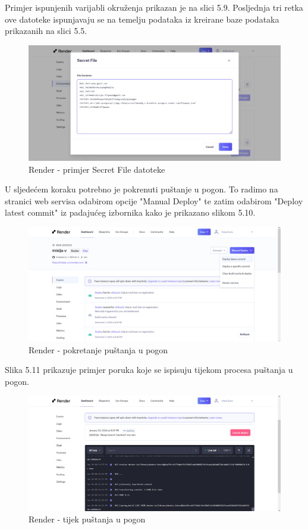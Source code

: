 			Primjer ispunjenih varijabli okruženja prikazan je na slici 5.9. Posljednja tri retka ove datoteke ispunjavaju se na temelju podataka iz kreirane baze podataka prikazanih na slici 5.5.
			
			\begin{figure}[H]
				\includegraphics[width=\textwidth]{slike/deploy6.PNG}
				\caption{Render - primjer Secret File datoteke}
				\label{fig:deployment6}
			\end{figure}
			
			U sljedećem koraku potrebno je pokrenuti puštanje u pogon. To radimo na stranici web servisa odabirom opcije "Manual Deploy" te zatim odabirom "Deploy latest commit" iz padajućeg izbornika kako je prikazano slikom 5.10.
			
			\begin{figure}[H]
				\includegraphics[width=\textwidth]{slike/deploy7.PNG}
				\caption{Render - pokretanje puštanja u pogon}
				\label{fig:deployment7}
			\end{figure}
			
			Slika 5.11 prikazuje primjer poruka koje se ispisuju tijekom procesa puštanja u pogon.
			
			\begin{figure}[H]
				\includegraphics[width=\textwidth]{slike/deploy8.PNG}
				\caption{Render - tijek puštanja u pogon}
				\label{fig:deployment8}
			\end{figure}
			
